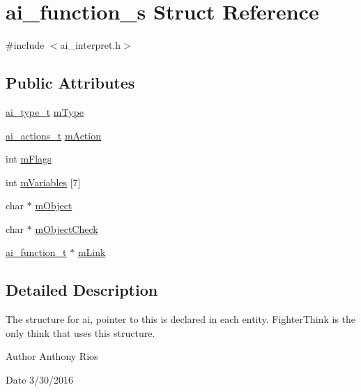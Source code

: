 \hypertarget{structai__function__s}{}\section{ai\+\_\+function\+\_\+s Struct Reference}
\label{structai__function__s}


{\ttfamily \#include $<$ai\+\_\+interpret.\+h$>$}

\subsection*{Public Attributes}
\begin{DoxyCompactItemize}
\item 
\hyperlink{ai__interpret_8h_a9fc7d2b2756bda7167434e15ddd43159}{ai\+\_\+type\+\_\+t} \hyperlink{structai__function__s_a90d5d040e7fa0016b1388e456dc9bef1}{m\+Type}
\item 
\hyperlink{ai__interpret_8h_a42492ef6b9956883af49be159eb55dff}{ai\+\_\+actions\+\_\+t} \hyperlink{structai__function__s_af4d9b08ccfe717ad1ce41234e83e31f0}{m\+Action}
\item 
int \hyperlink{structai__function__s_a6b557bb606ab18dca509b783011bd94e}{m\+Flags}
\item 
int \hyperlink{structai__function__s_a6469b5462335a0b31b5f9e28e24c7767}{m\+Variables} \mbox{[}7\mbox{]}
\item 
char $\ast$ \hyperlink{structai__function__s_a3d82a5e9fd73222757928edd103e34b2}{m\+Object}
\item 
char $\ast$ \hyperlink{structai__function__s_a60d8dbe354717f8965d8ffbe012b0c07}{m\+Object\+Check}
\item 
\hyperlink{ai__interpret_8h_a93e23f66130135adeb83b13c29f36fca}{ai\+\_\+function\+\_\+t} $\ast$ \hyperlink{structai__function__s_ae9b7b8987b3ebbb9bcd8298b14b37ea3}{m\+Link}
\end{DoxyCompactItemize}


\subsection{Detailed Description}
The structure for ai, pointer to this is declared in each entity. Fighter\+Think is the only think that uses this structure.

\begin{DoxyAuthor}{Author}
Anthony Rios 
\end{DoxyAuthor}
\begin{DoxyDate}{Date}
3/30/2016 
\end{DoxyDate}


